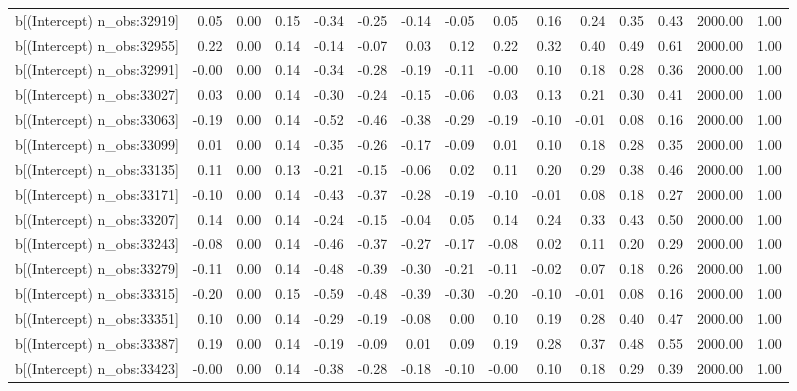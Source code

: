 \begin{table}[ht]
\begin{tabular}{rrrrrrrrrrrrrrr}
  b[(Intercept) n\_obs:32919] & 0.05 & 0.00 & 0.15 & -0.34 & -0.25 & -0.14 & -0.05 & 0.05 & 0.16 & 0.24 & 0.35 & 0.43 & 2000.00 & 1.00 \\ 
  b[(Intercept) n\_obs:32955] & 0.22 & 0.00 & 0.14 & -0.14 & -0.07 & 0.03 & 0.12 & 0.22 & 0.32 & 0.40 & 0.49 & 0.61 & 2000.00 & 1.00 \\ 
  b[(Intercept) n\_obs:32991] & -0.00 & 0.00 & 0.14 & -0.34 & -0.28 & -0.19 & -0.11 & -0.00 & 0.10 & 0.18 & 0.28 & 0.36 & 2000.00 & 1.00 \\ 
  b[(Intercept) n\_obs:33027] & 0.03 & 0.00 & 0.14 & -0.30 & -0.24 & -0.15 & -0.06 & 0.03 & 0.13 & 0.21 & 0.30 & 0.41 & 2000.00 & 1.00 \\ 
  b[(Intercept) n\_obs:33063] & -0.19 & 0.00 & 0.14 & -0.52 & -0.46 & -0.38 & -0.29 & -0.19 & -0.10 & -0.01 & 0.08 & 0.16 & 2000.00 & 1.00 \\ 
  b[(Intercept) n\_obs:33099] & 0.01 & 0.00 & 0.14 & -0.35 & -0.26 & -0.17 & -0.09 & 0.01 & 0.10 & 0.18 & 0.28 & 0.35 & 2000.00 & 1.00 \\ 
  b[(Intercept) n\_obs:33135] & 0.11 & 0.00 & 0.13 & -0.21 & -0.15 & -0.06 & 0.02 & 0.11 & 0.20 & 0.29 & 0.38 & 0.46 & 2000.00 & 1.00 \\ 
  b[(Intercept) n\_obs:33171] & -0.10 & 0.00 & 0.14 & -0.43 & -0.37 & -0.28 & -0.19 & -0.10 & -0.01 & 0.08 & 0.18 & 0.27 & 2000.00 & 1.00 \\ 
  b[(Intercept) n\_obs:33207] & 0.14 & 0.00 & 0.14 & -0.24 & -0.15 & -0.04 & 0.05 & 0.14 & 0.24 & 0.33 & 0.43 & 0.50 & 2000.00 & 1.00 \\ 
  b[(Intercept) n\_obs:33243] & -0.08 & 0.00 & 0.14 & -0.46 & -0.37 & -0.27 & -0.17 & -0.08 & 0.02 & 0.11 & 0.20 & 0.29 & 2000.00 & 1.00 \\ 
  b[(Intercept) n\_obs:33279] & -0.11 & 0.00 & 0.14 & -0.48 & -0.39 & -0.30 & -0.21 & -0.11 & -0.02 & 0.07 & 0.18 & 0.26 & 2000.00 & 1.00 \\ 
  b[(Intercept) n\_obs:33315] & -0.20 & 0.00 & 0.15 & -0.59 & -0.48 & -0.39 & -0.30 & -0.20 & -0.10 & -0.01 & 0.08 & 0.16 & 2000.00 & 1.00 \\ 
  b[(Intercept) n\_obs:33351] & 0.10 & 0.00 & 0.14 & -0.29 & -0.19 & -0.08 & 0.00 & 0.10 & 0.19 & 0.28 & 0.40 & 0.47 & 2000.00 & 1.00 \\ 
  b[(Intercept) n\_obs:33387] & 0.19 & 0.00 & 0.14 & -0.19 & -0.09 & 0.01 & 0.09 & 0.19 & 0.28 & 0.37 & 0.48 & 0.55 & 2000.00 & 1.00 \\ 
  b[(Intercept) n\_obs:33423] & -0.00 & 0.00 & 0.14 & -0.38 & -0.28 & -0.18 & -0.10 & -0.00 & 0.10 & 0.18 & 0.29 & 0.39 & 2000.00 & 1.00 \\ 

\end{tabular}
\end{table}
